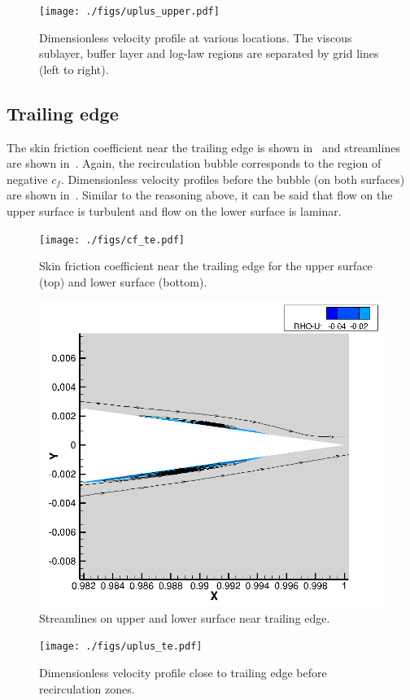 \begin{figure}
    \centering
    \texttt{[image: ./figs/uplus\_upper.pdf]}
    \caption{Dimensionless velocity profile at various locations. The viscous sublayer, buffer layer and
        log-law regions are separated by grid lines (left to right).}
    \label{fig:uplus_upper}
\end{figure}

\subsection{Trailing edge}
The skin friction coefficient near the trailing edge is shown in~ and streamlines are shown
in~. Again, the recirculation bubble corresponds to the region of negative
$c_f$. Dimensionless velocity profiles before the bubble (on both surfaces) are shown in~.
Similar to the reasoning above, it can be said that flow on the upper surface is turbulent and flow
on the lower surface is laminar.

\begin{figure}
    \centering
    \texttt{[image: ./figs/cf\_te.pdf]}
    \caption{Skin friction coefficient near the trailing edge for the upper surface (top) and
        lower surface (bottom).}\label{fig:cf_te}
\end{figure}

\begin{figure}
    \centering
    \includegraphics[width=1.0\textwidth]{./figs/recirculation_te.png}
    \caption{Streamlines on upper and lower surface near trailing edge.}\label{fig:recirculation_te}
\end{figure}

\begin{figure}
    \centering
    \texttt{[image: ./figs/uplus\_te.pdf]}
    \caption{Dimensionless velocity profile close to trailing edge before recirculation zones.}
    \label{fig:uplus_te}
\end{figure}
